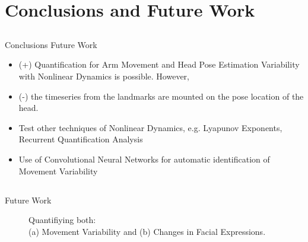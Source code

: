 

\section{Conclusions and Future Work}

\subsection{}
{
\begin{frame}{Conclusions Future Work}

\begin{itemize}
	\item (+) Quantification for Arm Movement and Head Pose Estimation Variability with Nonlinear Dynamics is possible. However,
	\item (-) the timeseries from the landmarks are mounted on the pose location of the head. 
\end{itemize}

\begin{itemize}
	\item Test other techniques of Nonlinear Dynamics, e.g. Lyapunov Exponents, Recurrent Quantification Analysis
	\item Use of Convolutional Neural Networks for automatic identification of Movement Variability
\end{itemize}

\end{frame}
}

\subsection{}
{

\begin{frame}{Future Work}
    \begin{figure}
	\caption{Quantifiying both: \\
		(a) Movement Variability and (b) Changes in Facial Expressions.} 
   \end{figure}
	
\end{frame}
}



